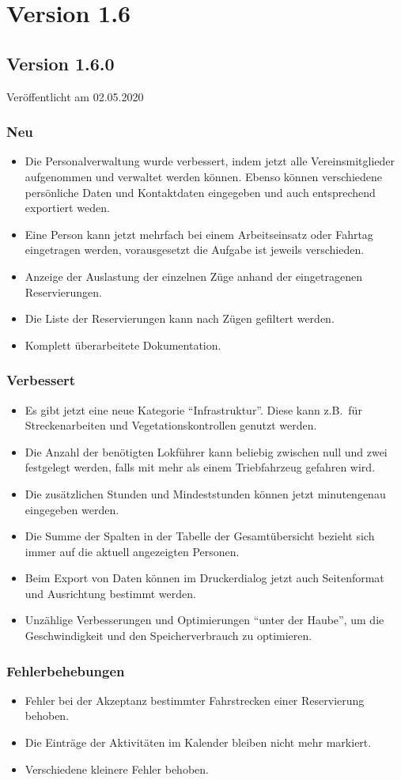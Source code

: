 \section{Version 1.6}\label{version:1:6}
\subsection{Version 1.6.0}
\label{version:1:6:0}
Veröffentlicht am 02.05.2020
\subsubsection{Neu}
\begin{itemize}
  \item
  Die Personalverwaltung wurde verbessert, indem jetzt alle Vereinsmitglieder aufgenommen und verwaltet werden können.
  Ebenso können verschiedene persönliche Daten und Kontaktdaten eingegeben und auch entsprechend exportiert weden.
  \item
  Eine Person kann jetzt mehrfach bei einem Arbeitseinsatz oder Fahrtag eingetragen werden,
  vorausgesetzt die Aufgabe ist jeweils verschieden.
  \item
  Anzeige der Auslastung der einzelnen Züge anhand der eingetragenen Reservierungen.
  \item
  Die Liste der Reservierungen kann nach Zügen gefiltert werden.
  \item
  Komplett überarbeitete Dokumentation.
\end{itemize}

\subsubsection{Verbessert}
\begin{itemize}
  \item
  Es gibt jetzt eine neue Kategorie "`Infrastruktur"'.
  Diese kann z.B.\ für Streckenarbeiten und Vegetationskontrollen genutzt werden.
  \item
  Die Anzahl der benötigten Lokführer kann beliebig zwischen null und zwei festgelegt werden,
  falls mit mehr als einem Triebfahrzeug gefahren wird.
  \item
  Die zusätzlichen Stunden und Mindeststunden können jetzt minutengenau eingegeben werden.
  \item
  Die Summe der Spalten in der Tabelle der Gesamtübersicht bezieht sich immer auf die aktuell angezeigten Personen.
  \item
  Beim Export von Daten können im Druckerdialog jetzt auch Seitenformat und Ausrichtung bestimmt werden.
  \item
  Unzählige Verbesserungen und Optimierungen "`unter der Haube"', um die Geschwindigkeit und den Speicherverbrauch zu optimieren.
\end{itemize}

\subsubsection{Fehlerbehebungen}
\begin{itemize}
  \item
  Fehler bei der Akzeptanz bestimmter Fahrstrecken einer Reservierung behoben.
  \item
  Die Einträge der Aktivitäten im Kalender bleiben nicht mehr markiert.
  \item
  Verschiedene kleinere Fehler behoben.
\end{itemize}
